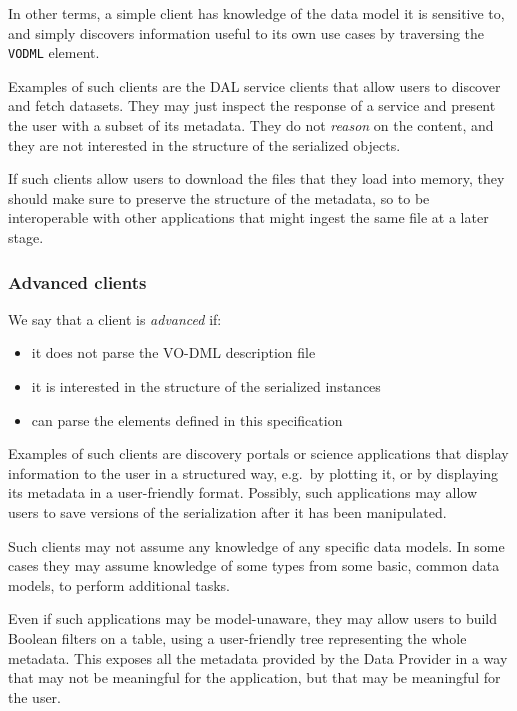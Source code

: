 \documentclass[11pt,a4paper]{ivoa}
\begin{document}
In other terms, a simple client has knowledge of the data model it is
sensitive to, and simply discovers information useful to its own use
cases by traversing the \texttt{VODML} element.

Examples of such clients are the DAL service clients that allow users to
discover and fetch datasets. They may just inspect the response of a
service and present the user with a subset of its metadata. They do not
\emph{reason} on the content, and they are not interested in the
structure of the serialized objects.

If such clients allow users to download the files that they load into
memory, they should make sure to preserve the structure of the metadata,
so to be interoperable with other applications that might ingest the
same file at a later stage.

\subsubsection{Advanced clients}\label{advanced-clients}

We say that a client is \emph{advanced} if:

\begin{itemize}
\item
  it does not parse the VO-DML description file
\item
  it is interested in the structure of the serialized instances
\item
  can parse the elements defined in this specification
\end{itemize}

Examples of such clients are discovery portals or science applications
that display information to the user in a structured way, e.g.~by
plotting it, or by displaying its metadata in a user-friendly format.
Possibly, such applications may allow users to save versions of the
serialization after it has been manipulated.

Such clients may not assume any knowledge of any specific data models.
In some cases they may assume knowledge of some types from some basic,
common data models, to perform additional tasks.

Even if such applications may be model-unaware, they may allow users to
build Boolean filters on a table, using a user-friendly tree
representing the whole metadata. This exposes all the metadata provided
by the Data Provider in a way that may not be meaningful for the
application, but that may be meaningful for the user.
\end{document}
